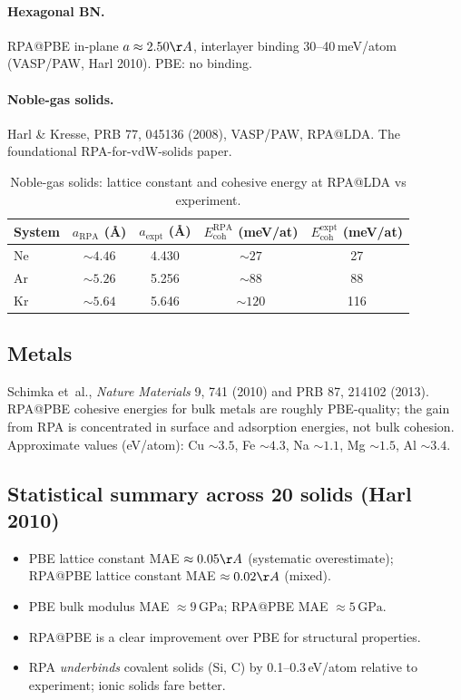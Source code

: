 \documentclass[11pt]{article}
\newcommand{\GPa}{\ensuremath{\,\mathrm{GPa}}}
\begin{document}
\paragraph{Hexagonal BN.}
RPA@PBE in-plane $a \approx 2.50\AA$, interlayer binding 30--40\,meV/atom
(VASP/PAW, Harl 2010). PBE: no binding.

\paragraph{Noble-gas solids.}
Harl \& Kresse, PRB 77, 045136 (2008), VASP/PAW, RPA@LDA. The foundational
RPA-for-vdW-solids paper.

\begin{table}[h]
\centering
\caption{Noble-gas solids: lattice constant and cohesive energy at RPA@LDA
vs experiment.}
\label{tab:noble_gas}
\small
\begin{tabular}{l c c c c}
\toprule
System & $a_{\mathrm{RPA}}$ (\AA) & $a_{\mathrm{expt}}$ (\AA) & $E_{\mathrm{coh}}^{\mathrm{RPA}}$ (meV/at) & $E_{\mathrm{coh}}^{\mathrm{expt}}$ (meV/at) \\
\midrule
Ne & $\sim 4.46$ & 4.430 & $\sim 27$  & 27 \\
Ar & $\sim 5.26$ & 5.256 & $\sim 88$  & 88 \\
Kr & $\sim 5.64$ & 5.646 & $\sim 120$ & 116 \\
\bottomrule
\end{tabular}
\end{table}

\subsection{Metals}

Schimka et~al., \emph{Nature Materials} 9, 741 (2010) and PRB 87, 214102
(2013). RPA@PBE cohesive energies for bulk metals are roughly
PBE-quality; the gain from RPA is concentrated in surface and adsorption
energies, not bulk cohesion. Approximate values (eV/atom): Cu $\sim 3.5$,
Fe $\sim 4.3$, Na $\sim 1.1$, Mg $\sim 1.5$, Al $\sim 3.4$.

\subsection{Statistical summary across 20 solids (Harl 2010)}

\begin{itemize}
  \item PBE lattice constant MAE $\approx 0.05\AA$ (systematic
        overestimate);\\
        RPA@PBE lattice constant MAE $\approx 0.02\AA$ (mixed).
  \item PBE bulk modulus MAE $\approx 9\GPa$;
        RPA@PBE MAE $\approx 5\GPa$.
  \item RPA@PBE is a clear improvement over PBE for structural
        properties.
  \item RPA \emph{underbinds} covalent solids (Si, C) by 0.1--0.3\,eV/atom
        relative to experiment; ionic solids fare better.
\end{itemize}
\end{document}
